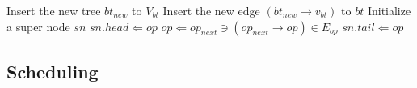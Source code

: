 \begin{algorithm}[ht!]
\begin{algorithmic}[1]
                        \State      Insert the new tree $bt_{new}$ to $V_{bt}$
                        \State      Insert the new edge $(bt_{new} \rightarrow v_{bt})$ to $bt$ \label{line:growelsee}
                        \EndIf                          \label{line:gbte}
                \EndIf
            \EndFunction
            \Statex %
              \label{line:bsns}
                \State  Initialize a super node $sn$ 
                \State  $sn.head \Leftarrow op$
                    \State   $op \Leftarrow op_{next} \ni (op_{next} \rightarrow op) \in E_{op}$ 
                \EndWhile
                \State  $sn.tail \Leftarrow op$
                \State      {}
            \EndFunction                        \label{line:bsne}
        \end{algorithmic}
        \label{alg:tohdfg}
        \end{algorithm}

    
        \subsection{Scheduling}

